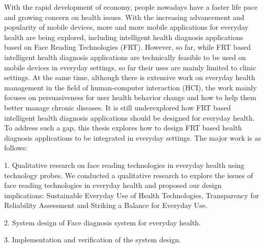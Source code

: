 \documentclass[type=master]{fduthesis}
\begin{document}
\begin{abstract*}

With the rapid development of economy, people nowadays have a faster life pace and growing concern on health issues. With the increasing advancement and popularity of mobile devices, more and more mobile applications for everyday health are being explored, including intelligent health diagnosis applications based on Face Reading Technologies (FRT). However, so far, while FRT based intelligent health diagnosis applications are technically feasible to be used on mobile devices in everyday settings, so far their uses are mainly limited to clinic settings. At the same time, although there is extensive work on everyday health management in the field of human-computer interaction (HCI), the work mainly focuses on persuasiveness for user health behavior change and how to help them better manage chronic diseases. It is still underexplored how FRT based intelligent health diagnosis applications should be designed for everyday health.
To address such a gap, this thesis explores how to design FRT based health diagnosis applications to be integrated in everyday settings. The major work is as follows: 

1.	Qualitative research on face reading technologies in everyday health using technology probes. We conducted a qualitative research to explore the issues of face reading technologies in everyday health and proposed our design implications: Sustainable Everyday Use of Health Technologies, Transparency for Reliability Assessment and Striking a Balance for Everyday Use. 

2.	System design of Face diagnosis system for everyday health. 

3.	Implementation and verification of the system design.


\end{abstract*}

% 
\mainmatter
\end{document}
